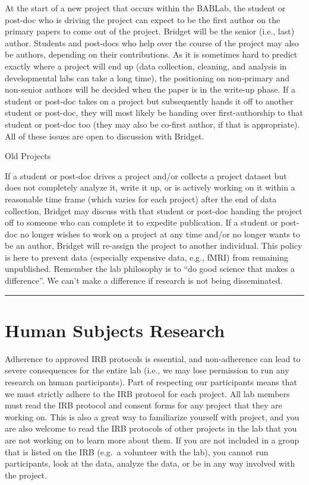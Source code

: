 \documentclass[
]{book}
\begin{document}
At the start of a new project that occurs within the BABLab, the student or post-doc who is driving the project can expect to be the first author on the primary papers to come out of the project. Bridget will be the senior (i.e., last) author. Students and post-docs who help over the course of the project may also be authors, depending on their contributions. As it is sometimes hard to predict exactly where a project will end up (data collection, cleaning, and analysis in developmental labs can take a long time), the positioning on non-primary and non-senior authors will be decided when the paper is in the write-up phase. If a student or post-doc takes on a project but subsequently hands it off to another student or post-doc, they will most likely be handing over first-authorship to that student or post-doc too (they may also be co-first author, if that is appropriate). All of these issues are open to discussion with Bridget.

Old Projects

If a student or post-doc drives a project and/or collects a project dataset but does not completely analyze it, write it up, or is actively working on it within a reasonable time frame (which varies for each project) after the end of data collection, Bridget may discuss with that student or post-doc handing the project off to someone who can complete it to expedite publication. If a student or post-doc no longer wishes to work on a project at any time and/or no longer wants to be an author, Bridget will re-assign the project to another individual. This policy is here to prevent data (especially expensive data, e.g., fMRI) from remaining unpublished. Remember the lab philosophy is to ``do good science that makes a difference''. We can't make a difference if research is not being disseminated.

\begin{center}\rule{0.5\linewidth}{0.5pt}\end{center}

\hypertarget{human-subjects-research}{%
\section{Human Subjects Research}\label{human-subjects-research}}

Adherence to approved IRB protocols is essential, and non-adherence can lead to severe consequences for the entire lab (i.e., we may lose permission to run any research on human participants). Part of respecting our participants means that we must strictly adhere to the IRB protocol for each project. All lab members must read the IRB protocol and consent forms for any project that they are working on. This is also a great way to familiarize yourself with project, and you are also welcome to read the IRB protocols of other projects in the lab that you are not working on to learn more about them. If you are not included in a group that is listed on the IRB (e.g.~a volunteer with the lab), you cannot run participants, look at the data, analyze the data, or be in any way involved with the project.
\end{document}

